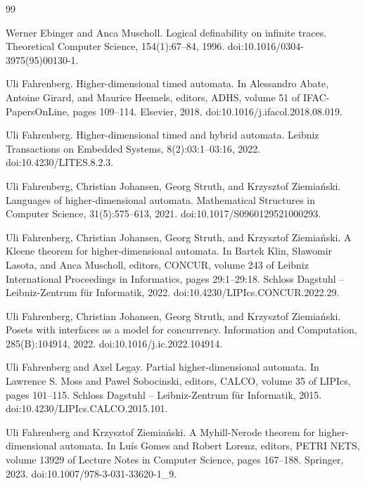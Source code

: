 \begin{thebibliography}{99}
\par\noindent    Werner Ebinger and Anca Muscholl.  Logical definability on infinite traces.  Theoretical Computer Science, 154(1):67–84, 1996.  doi:10.1016/0304-3975(95)00130-1.  

\par\noindent    Uli Fahrenberg.  Higher-dimensional timed automata.  In Alessandro Abate, Antoine Girard, and Maurice Heemels, editors, ADHS, volume 51 of IFAC-PapersOnLine, pages 109–114. Elsevier, 2018.  doi:10.1016/j.ifacol.2018.08.019.  

\par\noindent    Uli Fahrenberg.  Higher-dimensional timed and hybrid automata.  Leibniz Transactions on Embedded Systems, 8(2):03:1–03:16, 2022.  doi:10.4230/LITES.8.2.3.  

\par\noindent    Uli Fahrenberg, Christian Johansen, Georg Struth, and Krzysztof Ziemiański.  Languages of higher-dimensional automata.  Mathematical Structures in Computer Science, 31(5):575–613, 2021.  doi:10.1017/S0960129521000293.  

\par\noindent    Uli Fahrenberg, Christian Johansen, Georg Struth, and Krzysztof Ziemiański.  A Kleene theorem for higher-dimensional automata.  In Bartek Klin, Sławomir Lasota, and Anca Muscholl, editors, CONCUR, volume 243 of Leibniz International Proceedings in Informatics, pages 29:1–29:18. Schloss Dagstuhl – Leibniz-Zentrum für Informatik, 2022.  doi:10.4230/LIPIcs.CONCUR.2022.29.  

\par\noindent    Uli Fahrenberg, Christian Johansen, Georg Struth, and Krzysztof Ziemiański.  Posets with interfaces as a model for concurrency.  Information and Computation, 285(B):104914, 2022.  doi:10.1016/j.ic.2022.104914.  

\par\noindent    Uli Fahrenberg and Axel Legay.  Partial higher-dimensional automata.  In Lawrence S. Moss and Pawel Sobocinski, editors, CALCO, volume 35 of LIPIcs, pages 101–115. Schloss Dagstuhl – Leibniz-Zentrum für Informatik, 2015.  doi:10.4230/LIPIcs.CALCO.2015.101.  

\par\noindent    Uli Fahrenberg and Krzysztof Ziemiański.  A Myhill-Nerode theorem for higher-dimensional automata.  In Luís Gomes and Robert Lorenz, editors, PETRI NETS, volume 13929 of Lecture Notes in Computer Science, pages 167–188. Springer, 2023.  doi:10.1007/978-3-031-33620-1\_9.  


\end{thebibliography}
